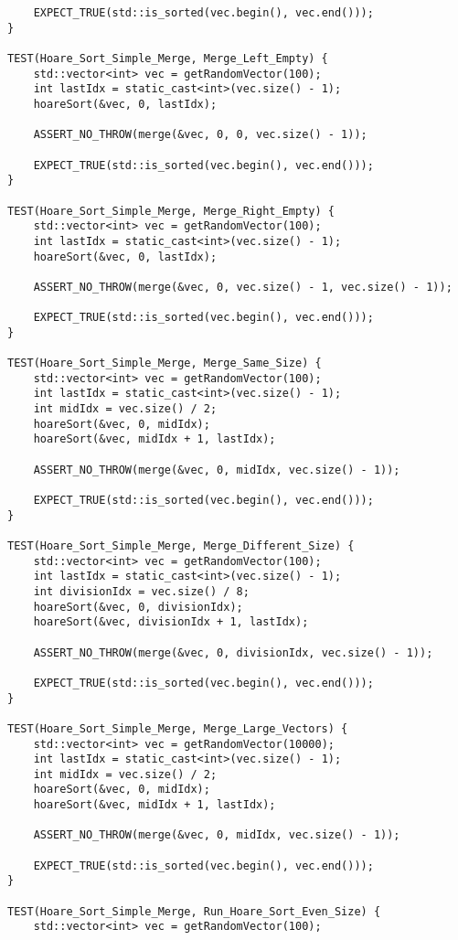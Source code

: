 \documentclass{report}
\begin{document}
\begin{lstlisting}
    EXPECT_TRUE(std::is_sorted(vec.begin(), vec.end()));
}

TEST(Hoare_Sort_Simple_Merge, Merge_Left_Empty) {
    std::vector<int> vec = getRandomVector(100);
    int lastIdx = static_cast<int>(vec.size() - 1);
    hoareSort(&vec, 0, lastIdx);

    ASSERT_NO_THROW(merge(&vec, 0, 0, vec.size() - 1));

    EXPECT_TRUE(std::is_sorted(vec.begin(), vec.end()));
}

TEST(Hoare_Sort_Simple_Merge, Merge_Right_Empty) {
    std::vector<int> vec = getRandomVector(100);
    int lastIdx = static_cast<int>(vec.size() - 1);
    hoareSort(&vec, 0, lastIdx);

    ASSERT_NO_THROW(merge(&vec, 0, vec.size() - 1, vec.size() - 1));

    EXPECT_TRUE(std::is_sorted(vec.begin(), vec.end()));
}

TEST(Hoare_Sort_Simple_Merge, Merge_Same_Size) {
    std::vector<int> vec = getRandomVector(100);
    int lastIdx = static_cast<int>(vec.size() - 1);
    int midIdx = vec.size() / 2;
    hoareSort(&vec, 0, midIdx);
    hoareSort(&vec, midIdx + 1, lastIdx);

    ASSERT_NO_THROW(merge(&vec, 0, midIdx, vec.size() - 1));

    EXPECT_TRUE(std::is_sorted(vec.begin(), vec.end()));
}

TEST(Hoare_Sort_Simple_Merge, Merge_Different_Size) {
    std::vector<int> vec = getRandomVector(100);
    int lastIdx = static_cast<int>(vec.size() - 1);
    int divisionIdx = vec.size() / 8;
    hoareSort(&vec, 0, divisionIdx);
    hoareSort(&vec, divisionIdx + 1, lastIdx);

    ASSERT_NO_THROW(merge(&vec, 0, divisionIdx, vec.size() - 1));

    EXPECT_TRUE(std::is_sorted(vec.begin(), vec.end()));
}

TEST(Hoare_Sort_Simple_Merge, Merge_Large_Vectors) {
    std::vector<int> vec = getRandomVector(10000);
    int lastIdx = static_cast<int>(vec.size() - 1);
    int midIdx = vec.size() / 2;
    hoareSort(&vec, 0, midIdx);
    hoareSort(&vec, midIdx + 1, lastIdx);

    ASSERT_NO_THROW(merge(&vec, 0, midIdx, vec.size() - 1));

    EXPECT_TRUE(std::is_sorted(vec.begin(), vec.end()));
}

TEST(Hoare_Sort_Simple_Merge, Run_Hoare_Sort_Even_Size) {
    std::vector<int> vec = getRandomVector(100);


\end{lstlisting}
\end{document}
